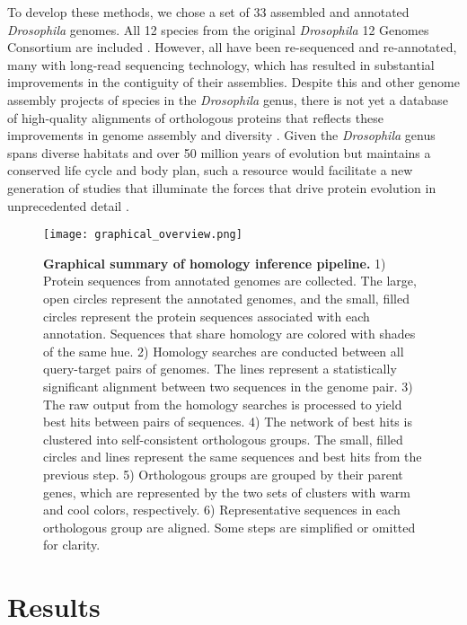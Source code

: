 \documentclass[10pt,letterpaper]{article}
\begin{document}
To develop these methods, we chose a set of 33 assembled and annotated \textit{Drosophila} genomes. All 12 species from the original \textit{Drosophila} 12 Genomes Consortium are included \cite{D12GC2007}. However, all have been re-sequenced and re-annotated, many with long-read sequencing technology, which has resulted in substantial improvements in the contiguity of their assemblies. Despite this and other genome assembly projects of species in the \textit{Drosophila} genus, there is not yet a database of high-quality alignments of orthologous proteins that reflects these improvements in genome assembly and diversity \cite{Miller2018, Kim2021}. Given the \textit{Drosophila} genus spans diverse habitats and over 50 million years of evolution but maintains a conserved life cycle and body plan, such a resource would facilitate a new generation of studies that illuminate the forces that drive protein evolution in unprecedented detail \cite{Wiegmann2011, Obbard2012}.

\begin{figure}[h!]
\texttt{[image: graphical\_overview.png]}
\centering
\caption{\textbf{Graphical summary of homology inference pipeline.}
1) Protein sequences from annotated genomes are collected. The large, open circles represent the annotated genomes, and the small, filled circles represent the protein sequences associated with each annotation. Sequences that share homology are colored with shades of the same hue. 2) Homology searches are conducted between all query-target pairs of genomes. The lines represent a statistically significant alignment between two sequences in the genome pair. 3) The raw output from the homology searches is processed to yield best hits between pairs of sequences. 4) The network of best hits is clustered into self-consistent orthologous groups. The small, filled circles and lines represent the same sequences and best hits from the previous step. 5) Orthologous groups are grouped by their parent genes, which are represented by the two sets of clusters with warm and cool colors, respectively. 6) Representative sequences in each orthologous group are aligned. Some steps are simplified or omitted for clarity.}
\label{fig:graphical_overview}
\end{figure}

\section*{Results}
\end{document}
